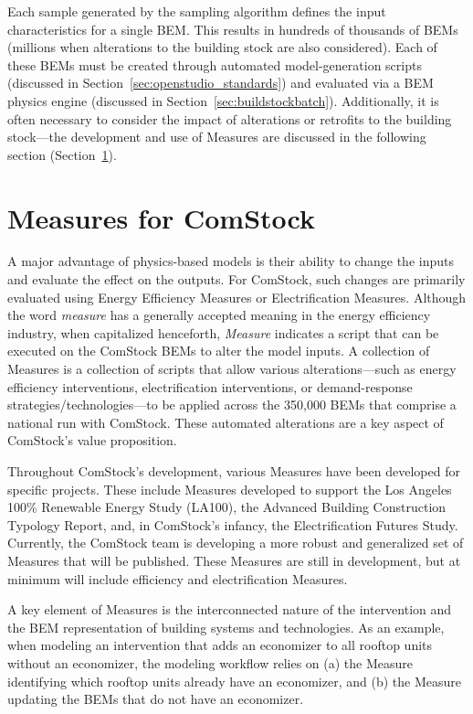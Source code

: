 Each sample generated by the sampling algorithm defines the input characteristics for a single BEM. This results in hundreds of thousands of BEMs (millions when alterations to the building stock are also considered). Each of these BEMs must be created through automated model-generation scripts (discussed in Section~\ref{sec:openstudio_standards}) and evaluated via a BEM physics engine (discussed in Section~\ref{sec:buildstockbatch}). Additionally, it is often necessary to consider the impact of alterations or retrofits to the building stock---the development and use of Measures are discussed in the following section (Section~\ref{sec:measures}).

\section{Measures for ComStock}
\label{sec:measures}

A major advantage of physics-based models is their ability to change the inputs and evaluate the effect on the outputs. For ComStock, such changes are primarily evaluated using Energy Efficiency Measures or Electrification Measures. Although the word \emph{measure} has a generally accepted meaning in the energy efficiency industry, when capitalized henceforth, \emph{Measure} indicates a script that can be executed on the ComStock BEMs to alter the model inputs. A collection of Measures is a collection of scripts that allow various alterations---such as energy efficiency interventions, electrification interventions, or demand-response strategies/technologies---to be applied across the 350,000 BEMs that comprise a national run with ComStock. These automated alterations are a key aspect of ComStock's value proposition.

Throughout ComStock's development, various Measures have been developed for specific projects. These include Measures developed to support the Los Angeles 100\% Renewable Energy Study (LA100), the Advanced Building Construction Typology Report, and, in ComStock's infancy, the Electrification Futures Study. Currently, the ComStock team is developing a more robust and generalized set of Measures that will be published. These Measures are still in development, but at minimum will include efficiency and electrification Measures.

A key element of Measures is the interconnected nature of the intervention and the BEM representation of building systems and technologies. As an example, when modeling an intervention that adds an economizer to all rooftop units without an economizer, the modeling workflow relies on (a) the Measure identifying which rooftop units already have an economizer, and (b) the Measure updating the BEMs that do not have an economizer.

